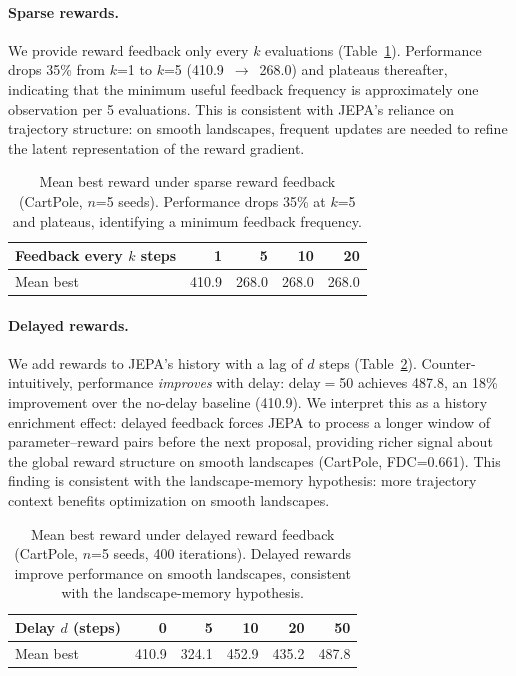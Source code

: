 \paragraph{Sparse rewards.}
We provide reward feedback only every $k$ evaluations
(Table~\ref{tab:sparse_rewards}).
Performance drops 35\% from $k$=1 to $k$=5 (410.9~$\to$~268.0)
and plateaus thereafter, indicating that the minimum useful feedback
frequency is approximately one observation per 5 evaluations.
This is consistent with JEPA's reliance on trajectory structure:
on smooth landscapes, frequent updates are needed to refine the
latent representation of the reward gradient.

\begin{table}[t]
\centering
\caption{Mean best reward under sparse reward feedback
(CartPole, $n$=5 seeds). Performance drops 35\% at $k$=5 and
plateaus, identifying a minimum feedback frequency.}
\label{tab:sparse_rewards}
\begin{tabular}{lrrrr}
\toprule
Feedback every $k$ steps & 1 & 5 & 10 & 20 \\
\midrule
Mean best & 410.9 & 268.0 & 268.0 & 268.0 \\
\bottomrule
\end{tabular}
\end{table}

\paragraph{Delayed rewards.}
We add rewards to JEPA's history with a lag of $d$ steps
(Table~\ref{tab:delayed_rewards}).
Counter-intuitively, performance \emph{improves} with delay:
delay$=$50 achieves 487.8, an 18\% improvement over the no-delay
baseline (410.9).
We interpret this as a history enrichment effect: delayed feedback
forces JEPA to process a longer window of parameter--reward pairs
before the next proposal, providing richer signal about the global
reward structure on smooth landscapes (CartPole, FDC=0.661).
This finding is consistent with the landscape-memory hypothesis:
more trajectory context benefits optimization on smooth landscapes.

\begin{table}[t]
\centering
\caption{Mean best reward under delayed reward feedback
(CartPole, $n$=5 seeds, 400 iterations).
Delayed rewards improve performance on smooth landscapes,
consistent with the landscape-memory hypothesis.}
\label{tab:delayed_rewards}
\begin{tabular}{lrrrrr}
\toprule
Delay $d$ (steps) & 0 & 5 & 10 & 20 & 50 \\
\midrule
Mean best & 410.9 & 324.1 & 452.9 & 435.2 & 487.8 \\
\bottomrule
\end{tabular}
\end{table}

